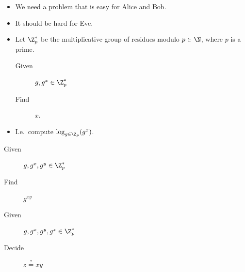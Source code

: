 \begin{frame}
  \begin{solution}[Requirements]
    \begin{itemize}
      \item We need a problem that is easy for Alice and Bob.
      \item It should be hard for Eve.
    \end{itemize}
  \end{solution}
\end{frame}

\begin{frame}
  \begin{definition}
    \begin{itemize}
      \item Let \(\Z_p^*\) be the multiplicative group of residues modulo 
        \(p\in \N\), where \(p\) is a prime.

        \pause{}

        \begin{description}
          \item[Given] \(g, g^x\in \Z_p^*\)
          \item[Find] \(x\).
        \end{description}

      \item I.e.\ compute \(\log_{g\in \Z_p}(g^x)\).
    \end{itemize}
  \end{definition}
\end{frame}

\begin{frame}
  \begin{definition}
    \begin{description}
      \item[Given] \(g, g^x, g^y\in \Z_p^*\)
      \item[Find] \(g^{xy}\)
    \end{description}
  \end{definition}

  \pause{}
  
  \begin{definition}
    \begin{description}
      \item[Given] \(g, g^x, g^y, g^z\in \Z_p^*\)
      \item[Decide] \(z \stackrel{?}{=} xy\)
    \end{description}
  \end{definition}
\end{frame}

